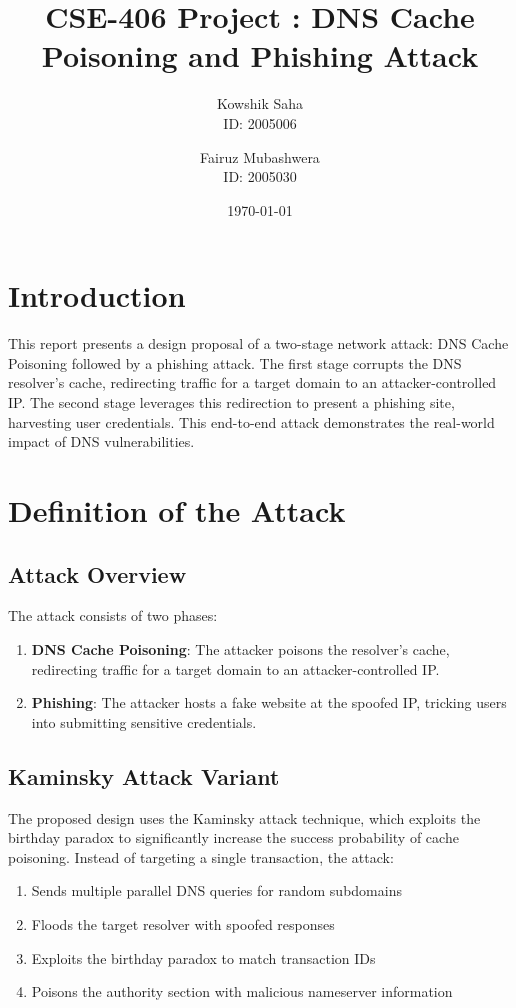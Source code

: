 \documentclass[12pt,a4paper]{article}
\title{CSE-406 Project : DNS Cache Poisoning and Phishing Attack}
\author{
    Kowshik Saha\\
    ID: 2005006
    \and
    Fairuz Mubashwera\\
    ID: 2005030
}
\date{\today}
\begin{document}
\maketitle

\tableofcontents
\newpage

\section{Introduction}

This report presents a design proposal of a two-stage network attack: DNS Cache Poisoning followed by a phishing attack. The first stage corrupts the DNS resolver's cache, redirecting traffic for a target domain to an attacker-controlled IP. The second stage leverages this redirection to present a phishing site, harvesting user credentials. This end-to-end attack demonstrates the real-world impact of DNS vulnerabilities.

\section{Definition of the Attack}

\subsection{Attack Overview}

The attack consists of two phases:
\begin{enumerate}
    \item \textbf{DNS Cache Poisoning}: The attacker poisons the resolver's cache, redirecting traffic for a target domain to an attacker-controlled IP.
    \item \textbf{Phishing}: The attacker hosts a fake website at the spoofed IP, tricking users into submitting sensitive credentials.
\end{enumerate}

\subsection{Kaminsky Attack Variant}

The proposed design uses the Kaminsky attack technique, which exploits the birthday paradox to significantly increase the success probability of cache poisoning. Instead of targeting a single transaction, the attack:

\begin{enumerate}
    \item Sends multiple parallel DNS queries for random subdomains
    \item Floods the target resolver with spoofed responses
    \item Exploits the birthday paradox to match transaction IDs
    \item Poisons the authority section with malicious nameserver information
\end{enumerate}
\end{document}
